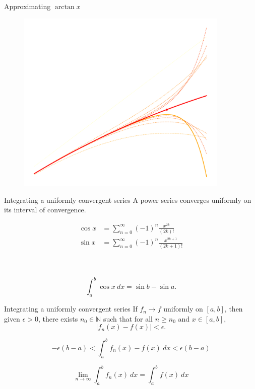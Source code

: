 \documentclass{beamer}
\def\N{\mathbb{N}}
\begin{document}
    \begin{frame}{Approximating $\arctan{x}$}
        \begin{figure}
            \centering
            \includegraphics[width=0.9\textwidth]{./img/arctan.png}
            \label{fig:arctan}
        \end{figure}
    \end{frame}

    \begin{frame}{Integrating a uniformly convergent series}
        A power series converges uniformly on its interval of convergence.

        \begin{align*}
            \cos{x} &= \sum_{n = 0}^\infty (-1)^n \frac{x^{2k}}{(2k)!} \\
            \sin{x} &= \sum_{n = 0}^\infty (-1)^n \frac{x^{2k + 1}}{(2k + 1)!}
        \end{align*}

        \\~\\

        \[
            \int_a^b \cos{x}\:dx = \sin{b} - \sin{a}.
        \] 
    \end{frame}

    \begin{frame}{Integrating a uniformly convergent series}
        If $f_n \to f$ uniformly on $[a, b]$, then given $\epsilon > 0$, there exists
        $n_0 \in \N$ such that for all $n \geq n_0$ and $x \in [a, b]$, \[
            |f_n(x) - f(x)| < \epsilon.
        \]

        \[
            -\epsilon(b - a) < \int_a^b f_n(x) - f(x) \:dx < \epsilon(b - a)
        \] 

        \[
            \lim_{n \to \infty} \int_a^b f_n(x)\:dx = \int_a^b f(x)\:dx
        \] 
    \end{frame}
\end{document}
